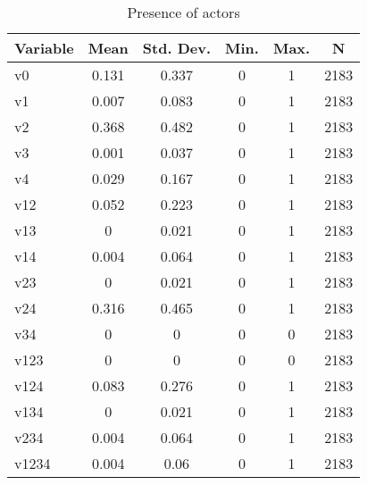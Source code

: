 
\begin{table}[htbp]\centering \caption{Presence of actors \label{sumstat}}
\begin{tabular}{l c c c c c}\hline\hline
\multicolumn{1}{c}{\textbf{Variable}} & \textbf{Mean}
 & \textbf{Std. Dev.}& \textbf{Min.} &  \textbf{Max.} & \textbf{N}\\ \hline
v0 & 0.131 & 0.337 & 0 & 1 & 2183\\
v1 & 0.007 & 0.083 & 0 & 1 & 2183\\
v2 & 0.368 & 0.482 & 0 & 1 & 2183\\
v3 & 0.001 & 0.037 & 0 & 1 & 2183\\
v4 & 0.029 & 0.167 & 0 & 1 & 2183\\
v12 & 0.052 & 0.223 & 0 & 1 & 2183\\
v13 & 0 & 0.021 & 0 & 1 & 2183\\
v14 & 0.004 & 0.064 & 0 & 1 & 2183\\
v23 & 0 & 0.021 & 0 & 1 & 2183\\
v24 & 0.316 & 0.465 & 0 & 1 & 2183\\
v34 & 0 & 0 & 0 & 0 & 2183\\
v123 & 0 & 0 & 0 & 0 & 2183\\
v124 & 0.083 & 0.276 & 0 & 1 & 2183\\
v134 & 0 & 0.021 & 0 & 1 & 2183\\
v234 & 0.004 & 0.064 & 0 & 1 & 2183\\
v1234 & 0.004 & 0.06 & 0 & 1 & 2183\\
\hline\end{tabular}
\end{table}
